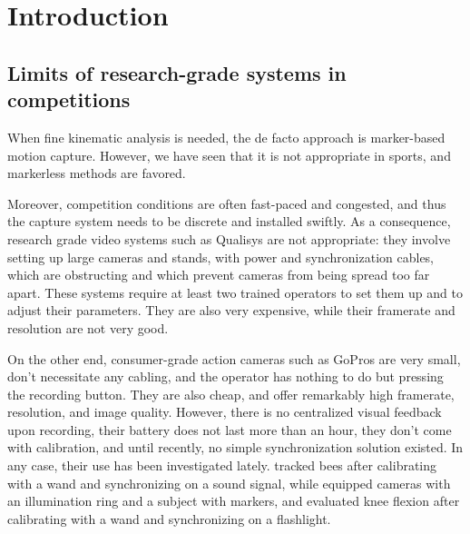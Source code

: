 \newpage

\section{Introduction}

\subsection{Limits of research-grade systems in competitions}

When fine kinematic analysis is needed, the de facto approach is marker-based motion capture. However, we have seen that it is not appropriate in sports, and markerless methods are favored.


Moreover, competition conditions are often fast-paced and congested, and thus the capture system needs to be discrete and installed swiftly. As a consequence, research grade video systems such as Qualisys are not appropriate: they involve setting up large cameras and stands, with power and synchronization cables, which are obstructing and which prevent cameras from being spread too far apart. These systems require at least two trained operators to set them up and to adjust their parameters. They are also very expensive, while their framerate and resolution are not very good. 

On the other end, consumer-grade action cameras such as GoPros are very small, don't necessitate any cabling, and the operator has nothing to do but pressing the recording button. They are also cheap, and offer remarkably high framerate, resolution, and image quality. However, there is no centralized visual feedback upon recording, their battery does not last more than an hour, they don't come with calibration, and until recently, no simple synchronization solution existed. In any case, their use has been investigated lately. \cite{Jackson2016} tracked bees after calibrating with a wand and synchronizing on a sound signal, while \cite{Dalla2019} equipped cameras with an illumination ring and a subject with markers, and evaluated knee flexion after calibrating with a wand and synchronizing on a flashlight.

